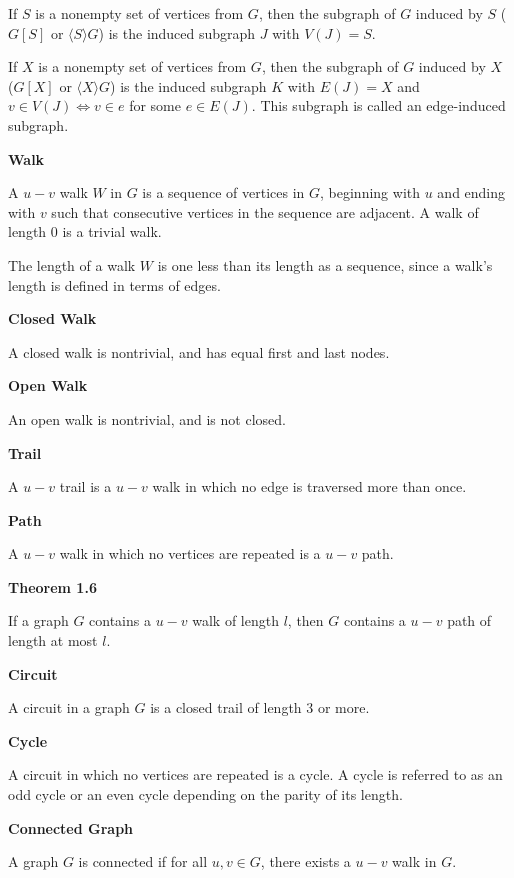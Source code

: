 \documentclass{article}
\begin{document}
    If $S$ is a nonempty set of vertices from $G$, then the subgraph of $G$ induced by $S$ ($G[S]$ or $\langle S \rangle G$) is the induced subgraph $J$ with $V(J) = S$.

    If $X$ is a nonempty set of vertices from $G$, then the subgraph of $G$ induced by $X$ ($G[X]$ or $\langle X \rangle G$) is the induced subgraph $K$ with $E(J) = X$ and $v \in V(J) \iff v \in e$ for some $e \in E(J)$. This subgraph is called an edge-induced subgraph.

\medskip\noindent\textbf{Walk}

    A $u-v$ walk $W$ in $G$ is a sequence of vertices in $G$, beginning with $u$ and ending with $v$ such that consecutive vertices in the sequence are adjacent. A walk of length 0 is a trivial walk.

    The length of a walk $W$ is one less than its length as a sequence, since a walk's length is defined in terms of edges.

\medskip\noindent\textbf{Closed Walk}

    A closed walk is nontrivial, and has equal first and last nodes.

\medskip\noindent\textbf{Open Walk}

    An open walk is nontrivial, and is not closed.

\medskip\noindent\textbf{Trail}

    A $u-v$ trail is a $u-v$ walk in which no edge is traversed more than once.

\medskip\noindent\textbf{Path}

    A $u-v$ walk in which no vertices are repeated is a $u-v$ path.

\medskip\noindent\textbf{Theorem 1.6}

    If a graph $G$ contains a $u-v$ walk of length $l$, then $G$ contains a $u-v$ path of length at most $l$.

\medskip\noindent\textbf{Circuit}

    A circuit in a graph $G$ is a closed trail of length 3 or more.

\medskip\noindent\textbf{Cycle}

    A circuit in which no vertices are repeated is a cycle. A cycle is referred to as an odd cycle or an even cycle depending on the parity of its length.

\medskip\noindent\textbf{Connected Graph}

    A graph $G$ is connected if for all $u,v \in G$, there exists a $u-v$ walk in $G$.
\end{document}
